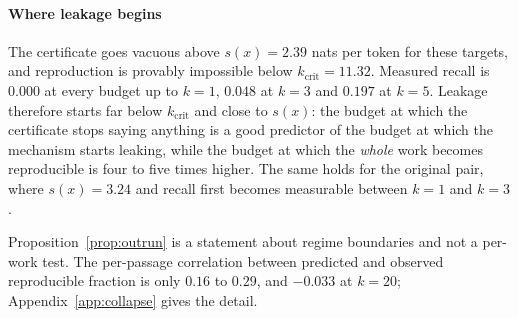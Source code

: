 \paragraph{Where leakage begins}
The certificate goes vacuous above $s(x) = 2.39$ nats per token for these targets, and reproduction
is provably impossible below $k_{\mathrm{crit}} = 11.32$. Measured recall is $0.000$ at every budget
up to $k=1$, $0.048$ at $k=3$ and $0.197$ at $k=5$. Leakage therefore starts far below
$k_{\mathrm{crit}}$ and close to $s(x)$: the budget at which the certificate stops saying anything
is a good predictor of the budget at which the mechanism starts leaking, while the budget at which
the \emph{whole} work becomes reproducible is four to five times higher. The same holds for the
original pair, where $s(x) = 3.24$ and recall first becomes measurable between $k=1$ and $k=3$.

Proposition~\ref{prop:outrun} is a statement about regime boundaries and not a per-work test.
The per-passage correlation between predicted and observed reproducible fraction is only $0.16$ to
$0.29$, and $-0.033$ at $k=20$; Appendix~\ref{app:collapse} gives the detail.
